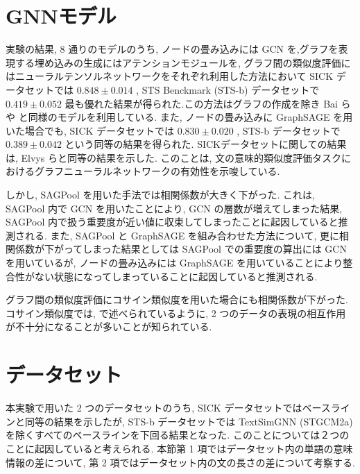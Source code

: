 \documentclass[a4j,twoside,12pt]{thesis} %
\begin{document}
\section{GNNモデル}
実験の結果, 8 通りのモデルのうち, ノードの畳み込みには GCN\cite{kipf2017semi} を,グラフを表現する埋め込みの生成にはアテンションモジュール\cite{bai2019simgnn}を, グラフ間の類似度評価にはニューラルテンソルネットワーク\cite{socher2013reasoning}をそれぞれ利用した方法において SICK データセットでは $0.848 \pm 0.014$ , STS Benckmark (STS-b) \cite{cer-etal-2017-semeval} データセットで $0.419 \pm 0.052$ 最も優れた結果が得られた.この方法はグラフの作成を除き Bai ら\cite{bai2019simgnn} や \cite{zhou2020sentence} と同様のモデルを利用している. また, ノードの畳み込みに GraphSAGE \cite{hamilton2017inductive} を用いた場合でも, SICK データセットでは $0.830 \pm 0.020$ , STS-b データセットで $0.389 \pm 0.042$ という同等の結果を得られた. SICKデータセットに関しての結果は, Elvys ら\cite{elvys2018predicting}と同等の結果を示した. このことは, 文の意味的類似度評価タスクにおけるグラフニューラルネットワークの有効性を示唆している.
\par しかし, SAGPool を用いた手法では相関係数が大きく下がった. これは, SAGPool 内で GCN を用いたことにより, GCN の層数が増えてしまった結果, SAGPool 内で扱う重要度が近い値に収束してしまったことに起因していると推測される. また, SAGPool と GraphSAGE を組み合わせた方法について, 更に相関係数が下がってしまった結果としては SAGPool での重要度の算出には GCN を用いているが, ノードの畳み込みには GraphSAGE を用いていることにより整合性がない状態になってしまっていることに起因していると推測される.
\par グラフ間の類似度評価にコサイン類似度を用いた場合にも相関係数が下がった.コサイン類似度では, \cite{socher2013reasoning} で述べられているように,  2 つのデータの表現の相互作用が不十分になることが多いことが知られている.

\section{データセット}
本実験で用いた 2 つのデータセットのうち, SICK データセットではベースラインと同等の結果を示したが, STS-b データセットでは TextSimGNN (STGCM2a) を除くすべてのベースラインを下回る結果となった.
このことについては２つのことに起因していると考えられる. 本節第 1 項ではデータセット内の単語の意味情報の差について, 第 2 項ではデータセット内の文の長さの差について考察する.
\end{document}
